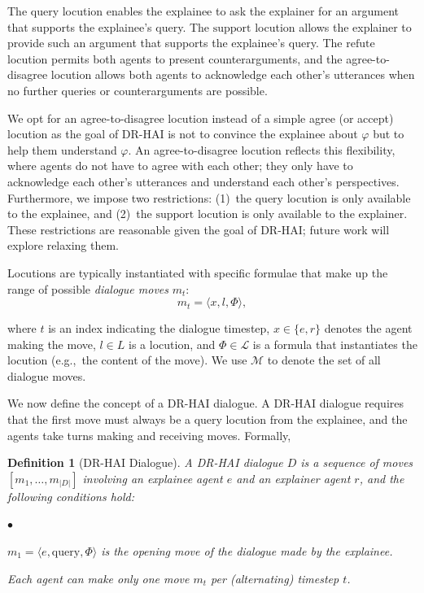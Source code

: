 \documentclass[letterpaper]{article} %
\newtheorem{definition}{{\bf Definition}}
\newcommand{\squishend}{\end{list}  }
\newcommand{\squishenum}{
\begin{list}{$\bullet$}{ 
    \setlength{\itemsep}{1pt}
    \setlength{\parsep}{0pt}
    \setlength{\topsep}{1.5pt}
    \setlength{\partopsep}{0pt}
    \setlength{\leftmargin}{2em}
    \setlength{\labelwidth}{1.5em}
    \setlength{\labelsep}{0.5em} } }
\begin{document}
The \mbox{query} locution enables the explainee to ask the explainer for an argument that \mbox{support}s the explainee's \mbox{query}. The $\mbox{support}$ locution allows the explainer to provide such an argument that \mbox{support}s the explainee's \mbox{query}. The $\mbox{refute}$ locution permits both agents to present counterarguments, and the \mbox{agree}-\mbox{to}-\mbox{disagree} locution allows both agents to acknowledge each other's utterances when no further queries or counterarguments are possible.

We opt for an \mbox{agree}-\mbox{to}-\mbox{disagree} locution instead of a simple \mbox{agree} (or \mbox{accept}) locution as the goal of DR-HAI is not to convince the explainee about $\varphi$ but to help them understand $\varphi$. An \mbox{agree}-\mbox{to}-\mbox{disagree} locution reflects this flexibility, where agents do not have to agree with each other; they only have to acknowledge each other's utterances and understand each other's perspectives. 
Furthermore, we impose two restrictions: (1)~the $\mbox{query}$ locution is only available to the explainee, and (2)~the $\mbox{support}$ locution is only available to the explainer. These restrictions are reasonable given the goal of DR-HAI; future work will explore relaxing them.

Locutions are typically instantiated with specific formulae that make up the range of possible \emph{dialogue moves} $m_t$:
\begin{equation}
m_t = \langle x, l, \Phi \rangle,
\end{equation}

\noindent where $t$ is an index indicating the dialogue timestep, $x\in \{e, r\}$ denotes the agent making the move, $l\in L$ is a locution, and $\Phi \in \mathcal{L}$ is a formula that instantiates the locution (e.g.,~the content of the move). We use $\mathcal{M}$ to denote the set of all dialogue moves.


We now define the concept of a DR-HAI dialogue. A DR-HAI dialogue requires that the first move must always be a $\mbox{query}$ locution from the explainee, and the agents take turns making and receiving moves. Formally,



\begin{definition}[DR-HAI Dialogue]

A \emph{DR-HAI dialogue} $D$ is a sequence of moves $[m_1,\ldots, m_{|D|}]$ involving an explainee agent $e$ and an explainer agent $r$, and the following conditions hold:
\squishenum
\item[1.] $m_1 = \langle e, \mbox{query}, \Phi \rangle$ is the opening move of the dialogue made by the explainee.
\item[2.] Each agent can make only one move $m_t$ per (alternating) timestep $t$.
\squishend
\label{DR_dialogue_def}
\end{definition}
\end{document}
